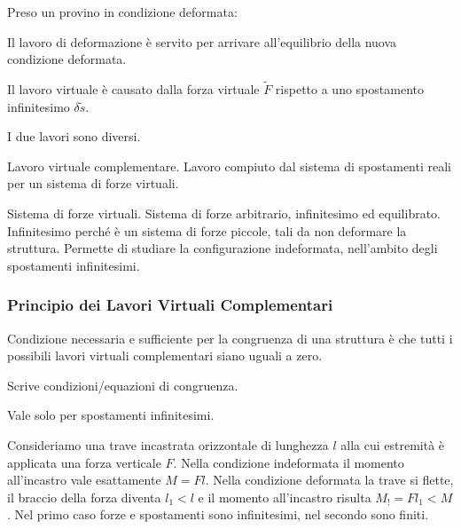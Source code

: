 \begin{esempioBox}
Preso un provino in condizione deformata:
\begin{compactitem}
    \item Il lavoro di deformazione è servito per arrivare all'equilibrio della nuova condizione deformata.
    \item Il lavoro virtuale è causato dalla forza virtuale $\tilde{F}$ rispetto a uno spostamento infinitesimo $\delta \tilde{s}$.
\end{compactitem}
I due lavori sono diversi.

\end{esempioBox}

\begin{definizioneBox}
    Lavoro virtuale complementare. Lavoro compiuto dal sistema di spostamenti reali per un sistema di forze virtuali.
\end{definizioneBox}
\begin{definizioneBox}
    Sistema di forze virtuali. Sistema di forze arbitrario, infinitesimo ed equilibrato.\\
    Infinitesimo perché è un sistema di forze piccole, tali da non deformare la struttura. Permette di studiare la configurazione indeformata, nell'ambito degli spostamenti infinitesimi.
\end{definizioneBox}

\subsubsection*{Principio dei Lavori Virtuali Complementari}
Condizione necessaria e sufficiente per la congruenza di una struttura è che tutti i possibili lavori virtuali complementari siano uguali a zero.

\begin{compactitem}
    \item Scrive condizioni/equazioni di congruenza.
    \item Vale solo per spostamenti infinitesimi.
\end{compactitem}

\begin{esempioBox}
    Consideriamo una trave incastrata orizzontale di lunghezza $l$ alla cui estremità è applicata una forza verticale $F$.
    Nella condizione indeformata il momento all'incastro vale esattamente $ M = Fl$.
    Nella condizione deformata la trave si flette, il braccio della forza diventa $l_1<l$ e il momento all'incastro risulta $M_! = Fl_1<M$.
    Nel primo caso forze e spostamenti sono infinitesimi, nel secondo sono finiti.
\end{esempioBox}








